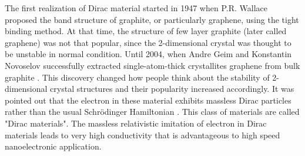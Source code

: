     The first realization of Dirac material started in 1947 when P.R. Wallace proposed the band structure of graphite, or particularly graphene, using the tight binding method.
    At that time, the structure of few layer graphite (later called graphene) was not that popular, since the 2-dimensional crystal was thought to be unstable in normal condition.
    Until 2004, when Andre Geim and Konstantin Novoselov successfully extracted single-atom-thick crystallites graphene from bulk graphite \cite{Zhang2004}.
    This discovery changed how people think about the stability of 2-dimensional crystal structures and their popularity increased accordingly.
    It was pointed out that the electron in these material exhibits massless Dirac particles rather than the usual Schrödinger Hamiltonian \cite{CastroNeto2009}.
    This class of materials are called "Dirac materials".
    The massless relativistic imitation of electron in Dirac materials leads to very high conductivity that is advantageous to high speed nanoelectronic application.

